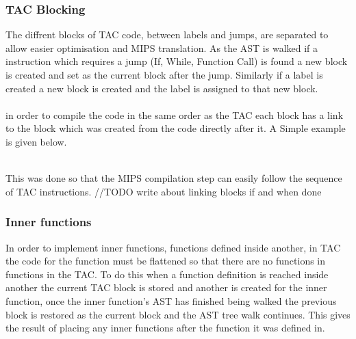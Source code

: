\documentclass{article}
\begin{document}
\subsubsection{TAC Blocking}

The diffrent blocks of TAC code, between labels and jumps, are separated to allow
easier optimisation and MIPS translation. As the AST is walked if a instruction which
requires a jump (If, While, Function Call) is found a new block is created and set as the
current block after the jump. Similarly if a label is created a new block is created
and the label is assigned to that new block.\\~\\
in order to compile the code in the same order as the TAC each block has a link to
the block which was created from the code directly after it. A Simple example is
given below.\\~\\

\begin{center}
\end{center}

This was done so that the MIPS compilation step can easily follow the sequence of
TAC instructions. //TODO write about linking blocks if and when done

\subsubsection{Inner functions}

In order to implement inner functions, functions defined inside another, in TAC
the code for the function must be flattened so that there are no functions in functions
in the TAC. To do this when a function definition is reached inside another the current
TAC block is stored and another is created for the inner function, once the inner function's
AST has finished being walked the previous block is restored as the current block and
the AST tree walk continues. This gives the result of placing any inner functions after
the function it was defined in.
\end{document}
